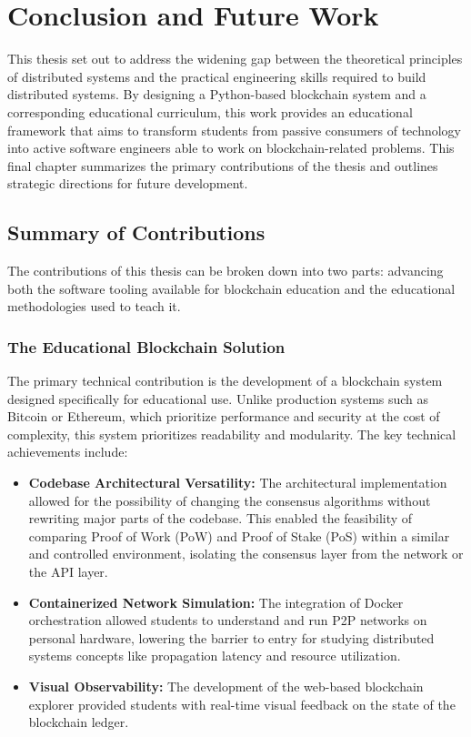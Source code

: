 \chapter{Conclusion and Future Work} \label{ch7_conclusion}

This thesis set out to address the widening gap between the theoretical principles of distributed systems and the practical engineering skills required to build distributed systems. By designing a Python-based blockchain system and a corresponding educational curriculum, this work provides an educational framework that aims to transform students from passive consumers of technology into active software engineers able to work on blockchain-related problems. This final chapter summarizes the primary contributions of the thesis and outlines strategic directions for future development.
\section{Summary of Contributions} \label{sec:contributions}
The contributions of this thesis can be broken down into two parts: advancing both the software tooling available for blockchain education and the educational methodologies used to teach it.

\subsection{The Educational Blockchain Solution}
The primary technical contribution is the development of a blockchain system designed specifically for educational use. Unlike production systems such as Bitcoin or Ethereum, which prioritize performance and security at the cost of complexity, this system prioritizes readability and modularity. The key technical achievements include:


\begin{itemize}
    \item \textbf{Codebase Architectural Versatility:} The architectural implementation allowed for the possibility of changing the consensus algorithms without rewriting major parts of the codebase. This enabled the feasibility of comparing Proof of Work (PoW) and Proof of Stake (PoS) within a similar and controlled environment, isolating the consensus layer from the network or the API layer.
    \item \textbf{Containerized Network Simulation:} The integration of Docker orchestration allowed students to understand and run P2P networks on personal hardware, lowering the barrier to entry for studying distributed systems concepts like propagation latency and resource utilization.
    \item \textbf{Visual Observability:} The development of the web-based blockchain explorer provided students with real-time visual feedback on the state of the blockchain ledger.
\end{itemize}


